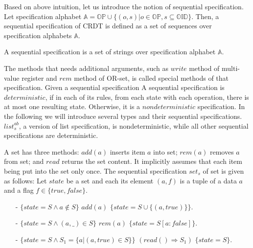 {Based on above intuition, let us introduce the notion of sequential specification. Let specification alphabet $\mathbb{A} = \mathbb{OP} \cup \{ (o,s) \vert o \in \mathbb{OP}, s \subseteq \mathbb{OID} \}$. Then, a sequential specification of CRDT is defined as a set of sequences over specification alphabets $\mathbb{A}$.

\begin{definition}
\label{definition:sequential specification}
A sequential specification is a set of strings over specification alphabet $\mathbb{A}$.
\end{definition}

The methods that needs additional arguments, such as $\mathit{write}$ method of multi-value register and $\mathit{rem}$ method of OR-set, is called special methods of that specification. Given a sequential specification  A sequential specification is $\mathit{deterministic}$, if in each of its rules, from each state with each operation, there is at most one resulting state. Otherwise, it is a $\mathit{nondeterministic}$ specification. In the following we will introduce several types and their sequential specifications. $\mathit{list}_s^{\mathit{ab}}$, a version of list specification, is nondeterministic, while all other sequential specifications are deterministic.


\begin{example}
\label{definition:sequential specification of set}
A set has three methods: $\mathit{add}(a)$ inserts item $a$ into set; $\mathit{rem}(a)$ removes $a$ from set; and $\mathit{read}$ returns the set content. It implicitly assumes that each item being put into the set only once. The sequential specification $\mathit{set}_s$ of set is given as follows:  Let $\mathit{state}$ be a set and each its element $(a,f)$ is a tuple of a data $a$ and a flag $f \in \{ \mathit{true},\mathit{false} \}$.

\begin{itemize}
\setlength{\itemsep}{0.5pt}
\item[-] $\{ \mathit{state} = S \wedge a \notin S \}$ $\mathit{add}(a)$ $\{ \mathit{state} = S \cup \{ (a,\mathit{true}) \} \}$.
\item[-] $\{ \mathit{state} = S \wedge (a,\_) \in S \}$ $\mathit{rem}(a)$ $\{ \mathit{state} = S[a:\mathit{false}] \}$.
\item[-] $\{ \mathit{state} = S \wedge S_1 = \{a \vert (a,\mathit{true}) \in S \} \}$ $(\mathit{read}() \Rightarrow S_1)$ $\{ \mathit{state} = S \}$.
\end{itemize}
\end{example}



}
